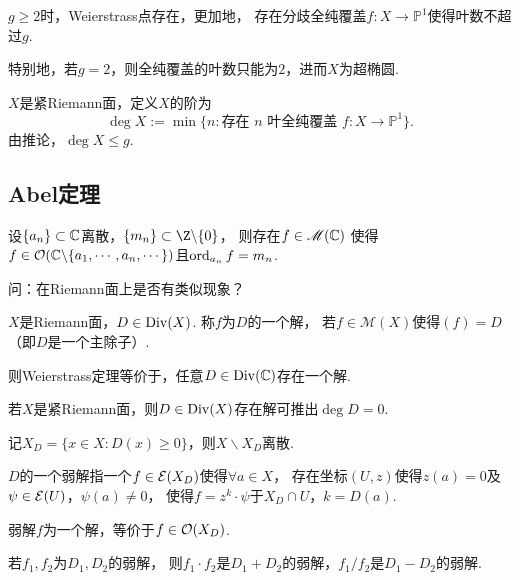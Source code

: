 \begin{corollary}
	$g\geq 2$时，Weierstrass点存在，更加地，
    存在分歧全纯覆盖$f\colon X \rightarrow \mathbb{P}^1$使得叶数不超过$g$.

	特别地，若$g=2$，则全纯覆盖的叶数只能为$2$，进而$X$为超椭圆.
\end{corollary}

\begin{definition}
	$X$是紧Riemann面，定义$X$的阶为
	$$\deg X:=\min \{n:\text{存在 }n\text{ 叶全纯覆盖 } 
    f\colon X\rightarrow \mathbb{P}^1\}.$$
	由推论，$\deg X\leq g$.
\end{definition}


\subsection{Abel定理}

\begin{theorem}[Weierstrass]
	设$\{a_n\}\subset \mathbb{C}$离散，$\{m_n\}\subset \Z\backslash \{0\}$，
    则存在$f\in \mathscr{M}(\mathbb{C})$
    使得$f\in \mathcal{O}(\mathbb{C}\backslash\{a_1,\cdots,a_n,\cdots\})$且$\operatorname{ord}_{a_n}f=m_n$.
\end{theorem}

问：在Riemann面上是否有类似现象？

\begin{definition}
	$X$是Riemann面，$D\in \operatorname{Div}(X)$. 称$f$为$D$的一个解，
    若$f\in \mathscr{M}(X)$使得$(f)=D$（即$D$是一个主除子）.
\end{definition}

\begin{remark}
	则Weierstrass定理等价于，任意$D\in \operatorname{Div}(\mathbb{C})$存在一个解.
\end{remark}

若$X$是紧Riemann面，则$D\in \operatorname{Div}(X)$存在解可推出$\deg D=0$. 

记$X_D=\{x\in X: D(x)\geq 0\}$，则$X\backslash X_D$离散.

\begin{definition}
	$D$的一个弱解指一个$f\in \mathcal{E}(X_D)$使得$\forall a\in X$，
    存在坐标$(U,z)$使得$z(a)=0$及$\psi\in \mathcal{E}(U)$，$\psi(a)\neq 0$，
    使得$f=z^k\cdot \psi$于$X_D\cap U$，$k=D(a)$.

	弱解$f$为一个解，等价于$f\in \mathcal{O}(X_D)$.
\end{definition}

\begin{proposition}
	若$f_1,f_2$为$D_1,D_2$的弱解，
    则$f_1\cdot f_2$是$D_1+D_2$的弱解，$f_1/f_2$是$D_1-D_2$的弱解.
\end{proposition}

